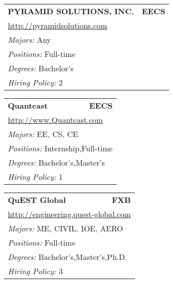 \documentclass[twoside]{article}
\begin{document}
\begin{center}
\begin{multicols}{3}
\begin{FlushLeft}
\begin{minipage}{.9\columnwidth}
\end{minipage}
 
\begin{minipage}{.9\columnwidth}\begin{tabularx}{.95\columnwidth}{Xr}
                 {\Large\bf PYRAMID SOLUTIONS, INC.} & {\Large\bf EECS}\\
    \multicolumn{2}{p{.95\columnwidth}}{\url{http://pyramidsolutions.com}}\\
    \multicolumn{2}{p{.95\columnwidth}}{\emph{Majors:} Any}\\
    \multicolumn{2}{p{.95\columnwidth}}{\emph{Positions:} Full-time}\\
    \multicolumn{2}{p{.95\columnwidth}}{\emph{Degrees:} Bachelor's}\\
    \multicolumn{2}{p{.95\columnwidth}}{\emph{Hiring Policy:} 2}\\
    \end{tabularx}
    
\end{minipage}
 
\begin{minipage}{.9\columnwidth}\begin{tabularx}{.95\columnwidth}{Xr}
                 {\Large\bf Quantcast} & {\Large\bf EECS}\\
    \multicolumn{2}{p{.95\columnwidth}}{\url{http://www.Quantcast.com}}\\
    \multicolumn{2}{p{.95\columnwidth}}{\emph{Majors:} EE, CS, CE}\\
    \multicolumn{2}{p{.95\columnwidth}}{\emph{Positions:} Internship,Full-time}\\
    \multicolumn{2}{p{.95\columnwidth}}{\emph{Degrees:} Bachelor's,Master's}\\
    \multicolumn{2}{p{.95\columnwidth}}{\emph{Hiring Policy:} 1}\\
    \end{tabularx}
    
\end{minipage}
 
\begin{minipage}{.9\columnwidth}\begin{tabularx}{.95\columnwidth}{Xr}
                 {\Large\bf QuEST Global} & {\Large\bf FXB}\\
    \multicolumn{2}{p{.95\columnwidth}}{\url{http://engineering.quest-global.com}}\\
    \multicolumn{2}{p{.95\columnwidth}}{\emph{Majors:} ME, CIVIL, IOE, AERO}\\
    \multicolumn{2}{p{.95\columnwidth}}{\emph{Positions:} Full-time}\\
    \multicolumn{2}{p{.95\columnwidth}}{\emph{Degrees:} Bachelor's,Master's,Ph.D.}\\
    \multicolumn{2}{p{.95\columnwidth}}{\emph{Hiring Policy:} 3}\\
    \end{tabularx}
    

\end{minipage}
\end{FlushLeft}
\end{multicols}
\end{center}
\end{document}
